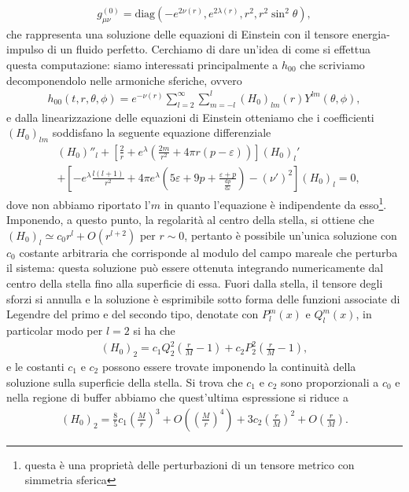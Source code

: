\begin{align}
	g_{\mu \nu}^{(0)} = \text{diag}(-e^{2 \nu(r)}, e^{2 \lambda(r)}, r^2, r^2 \sin^2{\theta}),
\end{align}
che rappresenta una soluzione delle equazioni di Einstein con il tensore energia-impulso di un fluido perfetto. Cerchiamo di dare un'idea di come si effettua questa computazione: siamo interessati principalmente a $h_{00}$ che scriviamo decomponendolo nelle armoniche sferiche, ovvero
\begin{align}
	h_{00}(t, r, \theta, \phi) = e^{-\nu(r)} \sum_{l=2}^{\infty} \sum_{m=-l}^l (H_0)_{lm}(r)Y^{lm}(\theta, \phi),
\end{align}
e dalla linearizzazione delle equazioni di Einstein otteniamo che i coefficienti $(H_0)_{lm}$ soddisfano la seguente equazione differenziale
\begin{align}
	&(H_0)''_l + \left[ \frac{2}{r} + e^{\lambda} \left( \frac{2m}{r^2} + 4 \pi r(p - \varepsilon) \right) \right] (H_0)_l' \\
	&+\left[ -e^\lambda \frac{l(l+1)}{r^2} + 4 \pi e^{\lambda} \left(5 \varepsilon + 9p + \frac{\varepsilon + p}{\frac{\mathrm{d}p}{\mathrm{d}\varepsilon}}\right) - (\nu')^2 \right] (H_0)_l = 0,
\end{align}
dove non abbiamo riportato l'$m$ in quanto l'equazione è indipendente da esso\footnote{questa è una proprietà delle perturbazioni di un tensore metrico con simmetria sferica}. Imponendo, a questo punto, la regolarità al centro della stella, si ottiene che $(H_0)_l \simeq c_0 r^l + O(r^{l+2})$ per $r \sim 0$, pertanto è possibile un'unica soluzione con $c_0$ costante arbitraria che corrisponde al modulo del campo mareale che perturba il sistema: questa soluzione può essere ottenuta integrando numericamente dal centro della stella  fino alla superficie di essa. Fuori dalla stella, il tensore degli sforzi si annulla e la soluzione è esprimibile sotto forma delle funzioni associate di Legendre del primo e del secondo tipo, denotate con $P_l^m(x)$ e $Q^m_l(x)$, in particolar modo per $l=2$ si ha che
\begin{align} 
	(H_0)_2 = c_1 Q_2^2 \left( \frac{r}{M} - 1 \right) + c_2 P_2^2 \left( \frac{r}{M} - 1 \right),
\end{align}
e le costanti $c_1$ e $c_2$ possono essere trovate imponendo la continuità della soluzione sulla superficie della stella. Si trova che $c_1$ e $c_2$ sono proporzionali a $c_0$ e nella regione di buffer abbiamo che quest'ultima espressione si riduce a
\begin{align} \label{eq:buffer_h}
	(H_0)_2 = \frac85 c_1 \left( \frac{M}{r} \right)^3 + O \left( \left( \frac{M}{r}\right)^4 \right) + 3c_2 \left( \frac{r}{M} \right)^2 + O \left( \frac{r}{M} \right).
\end{align}
